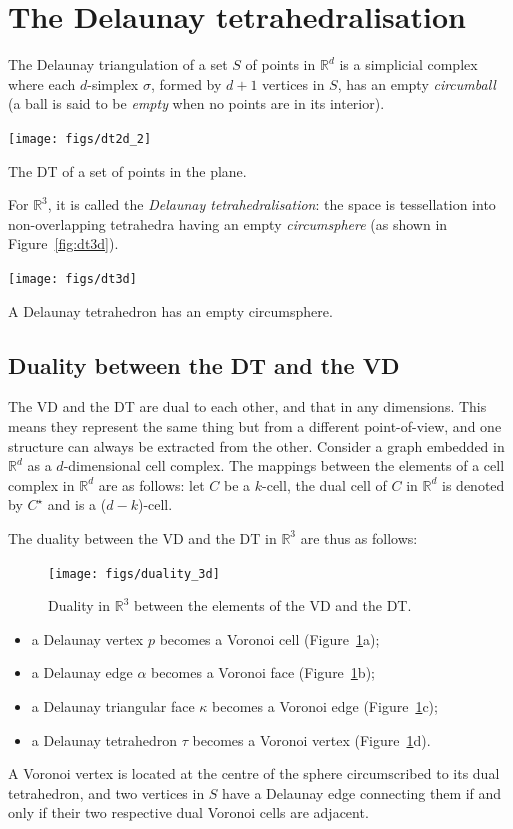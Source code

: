 %
\section[Delaunay tetrahedralisation]{The Delaunay tetrahedralisation}

The Delaunay triangulation of a set $S$ of points in $\mathbb{R}^d$ is a simplicial complex where each $d$-simplex $\sigma$, formed by $d+1$ vertices in $S$, has an empty \emph{circumball} (a ball is said to be \emph{empty} when no points are in its interior). 
\begin{marginfigure}
  \centering
  \texttt{[image: figs/dt2d\_2]}
  \caption{The DT of a set of points in the plane.}%
  \label{fig:dt2d_2}
\end{marginfigure}
For $\mathbb{R}^3$, it is called the \emph{Delaunay tetrahedralisation}: the space is tessellation into non-overlapping tetrahedra having an empty \emph{circumsphere} (as shown in Figure~\ref{fig:dt3d}).
\begin{marginfigure}
  \centering
  \texttt{[image: figs/dt3d]}
  \caption{A Delaunay tetrahedron has an empty circumsphere.}%
\label{fig:dt3d}
\end{marginfigure}


\subsection{Duality between the DT and the VD}

The VD and the DT are dual to each other, and that in any dimensions.
This means they represent the same thing but from a different point-of-view, and one structure can always be extracted from the other.
Consider a graph embedded in $\mathbb{R}^{d}$ as a $d$-dimensional cell complex. 
The mappings between the elements of a cell complex in $\mathbb{R}^{d}$ are as follows: let $C$ be a $k$-cell, the dual cell of $C$ in $\mathbb{R}^{d}$ is denoted by $C^{\star}$ and is a ($d-k$)-cell. 

%

The duality between the VD and the DT in $\mathbb{R}^3$ are thus as follows: 
\begin{figure}
  \centering
  \texttt{[image: figs/duality\_3d]}
  \caption{Duality in $\mathbb{R}^{3}$ between the elements of the VD and the DT.}%
\label{fig:duality_3d}
\end{figure}
\begin{itemize}
  \item a Delaunay vertex $p$ becomes a Voronoi cell (Figure~\ref{fig:duality_3d}a); 
  \item a Delaunay edge $\alpha$ becomes a Voronoi face (Figure~\ref{fig:duality_3d}b);
  \item a Delaunay triangular face $\kappa$ becomes a Voronoi edge (Figure~\ref{fig:duality_3d}c);
  \item a Delaunay tetrahedron $\tau$ becomes a Voronoi vertex (Figure~\ref{fig:duality_3d}d). 
\end{itemize}
A Voronoi vertex is located at the centre of the sphere circumscribed to its dual tetrahedron, and two vertices in $S$ have a Delaunay edge connecting them if and only if their two respective dual Voronoi cells are adjacent.



